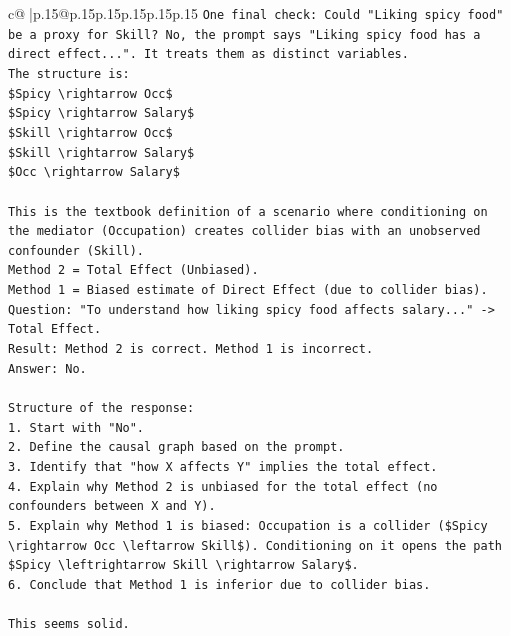 \documentclass{article}
\begin{document}
{\begin{supertabular}{c@{$\;$}|p{.15\linewidth}@{}p{.15\linewidth}p{.15\linewidth}p{.15\linewidth}p{.15\linewidth}p{.15\linewidth}}
{{{\texttt{One final check: Could "Liking spicy food" be a proxy for Skill? No, the prompt says "Liking spicy food has a direct effect...". It treats them as distinct variables.} \\
\texttt{The structure is:} \\
\texttt{\$Spicy \textbackslash{}rightarrow Occ\$} \\
\texttt{\$Spicy \textbackslash{}rightarrow Salary\$} \\
\texttt{\$Skill \textbackslash{}rightarrow Occ\$} \\
\texttt{\$Skill \textbackslash{}rightarrow Salary\$} \\
\texttt{\$Occ \textbackslash{}rightarrow Salary\$} \\
\\ 
\texttt{This is the textbook definition of a scenario where conditioning on the mediator (Occupation) creates collider bias with an unobserved confounder (Skill).} \\
\texttt{Method 2 = Total Effect (Unbiased).} \\
\texttt{Method 1 = Biased estimate of Direct Effect (due to collider bias).} \\
\texttt{Question: "To understand how liking spicy food affects salary..." {-}> Total Effect.} \\
\texttt{Result: Method 2 is correct. Method 1 is incorrect.} \\
\texttt{Answer: No.} \\
\\ 
\texttt{Structure of the response:} \\
\texttt{1. Start with "No".} \\
\texttt{2. Define the causal graph based on the prompt.} \\
\texttt{3. Identify that "how X affects Y" implies the total effect.} \\
\texttt{4. Explain why Method 2 is unbiased for the total effect (no confounders between X and Y).} \\
\texttt{5. Explain why Method 1 is biased: Occupation is a collider (\$Spicy \textbackslash{}rightarrow Occ \textbackslash{}leftarrow Skill\$). Conditioning on it opens the path \$Spicy \textbackslash{}leftrightarrow Skill \textbackslash{}rightarrow Salary\$.} \\
\texttt{6. Conclude that Method 1 is inferior due to collider bias.} \\
\\ 
\texttt{This seems solid.} \\
}}}
\end{supertabular}}
\end{document}
